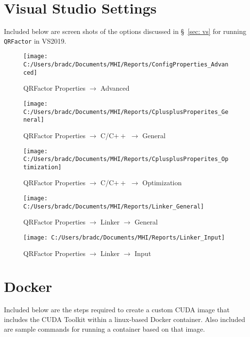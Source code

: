 \documentclass[11pt,letterpaper]{article}
\begin{document}
\appendix

\section{Visual Studio Settings}
\label{app: VS settings}

Included below are screen shots of the options discussed in \S~\!\ref{sec: vs} for
running \verb+QRFactor+ in VS2019.

\begin{figure}[!h]
  \centering
  \texttt{[image: C:/Users/bradc/Documents/MHI/Reports/ConfigProperties\_Advanced]}
  \label{f: configproperties_advanced}
  \caption{QRFactor Properties $\to$ Advanced}
\end{figure}

\begin{figure}[!h]
  \centering
  \texttt{[image: C:/Users/bradc/Documents/MHI/Reports/CplusplusProperites\_General]}
  \caption{QRFactor Properties $\to$ C/C$++$ $\to$ General}
\end{figure}

\begin{figure}[!h]
  \centering
  \texttt{[image: C:/Users/bradc/Documents/MHI/Reports/CplusplusProperites\_Optimization]}
  \caption{QRFactor Properties $\to$ C/C$++$ $\to$ Optimization}
\end{figure}

\begin{figure}[!h]
  \centering
  \texttt{[image: C:/Users/bradc/Documents/MHI/Reports/Linker\_General]}
  \caption{QRFactor Properties $\to$ Linker $\to$ General}
\end{figure}

\begin{figure}[!h]
  \centering
  \texttt{[image: C:/Users/bradc/Documents/MHI/Reports/Linker\_Input]}
  \caption{QRFactor Properties $\to$ Linker $\to$ Input}
\end{figure}


\section{Docker}
\label{app:docker}

Included below are the steps required to create a custom CUDA image that includes
the CUDA Toolkit within a linux-based Docker container. Also included are sample commands for running
a container based on that image.
\end{document}
